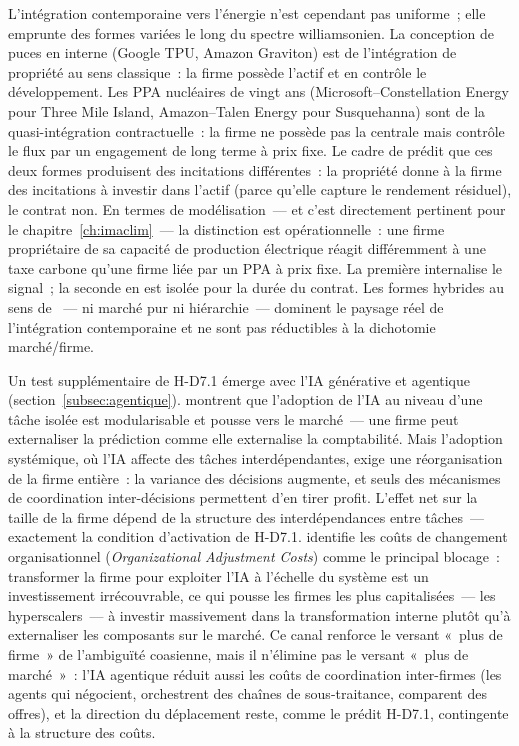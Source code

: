 L'intégration contemporaine vers l'énergie n'est cependant pas uniforme~; elle emprunte des formes variées le long du spectre williamsonien. La conception de puces en interne (Google TPU, Amazon Graviton) est de l'intégration de propriété au sens classique~: la firme possède l'actif et en contrôle le développement. Les PPA nucléaires de vingt ans (Microsoft--Constellation Energy pour Three Mile Island, Amazon--Talen Energy pour Susquehanna) sont de la quasi-intégration contractuelle~: la firme ne possède pas la centrale mais contrôle le flux par un engagement de long terme à prix fixe. Le cadre de \textcite{hart_property_1990} prédit que ces deux formes produisent des incitations différentes~: la propriété donne à la firme des incitations à investir dans l'actif (parce qu'elle capture le rendement résiduel), le contrat non. En termes de modélisation~--- et c'est directement pertinent pour le chapitre~\ref{ch:imaclim}~--- la distinction est opérationnelle~: une firme propriétaire de sa capacité de production électrique réagit différemment à une taxe carbone qu'une firme liée par un PPA à prix fixe. La première internalise le signal~; la seconde en est isolée pour la durée du contrat. Les formes hybrides au sens de \textcite{menard_economics_2004}~--- ni marché pur ni hiérarchie~--- dominent le paysage réel de l'intégration contemporaine et ne sont pas réductibles à la dichotomie marché/firme.

Un test supplémentaire de H-D7.1 émerge avec l'IA générative et agentique (section~\ref{subsec:agentique}). \textcite{agrawal_ai_2024} montrent que l'adoption de l'IA au niveau d'une tâche isolée est modularisable et pousse vers le marché~--- une firme peut externaliser la prédiction comme elle externalise la comptabilité. Mais l'adoption systémique, où l'IA affecte des tâches interdépendantes, exige une réorganisation de la firme entière~: la variance des décisions augmente, et seuls des mécanismes de coordination inter-décisions permettent d'en tirer profit. L'effet net sur la taille de la firme dépend de la structure des interdépendances entre tâches~--- exactement la condition d'activation de H-D7.1. \textcite{bresnahan_innovation_2023} identifie les coûts de changement organisationnel (\emph{Organizational Adjustment Costs}) comme le principal blocage~: transformer la firme pour exploiter l'IA à l'échelle du système est un investissement irrécouvrable, ce qui pousse les firmes les plus capitalisées~--- les hyperscalers~--- à investir massivement dans la transformation interne plutôt qu'à externaliser les composants sur le marché. Ce canal renforce le versant «~plus de firme~» de l'ambiguïté coasienne, mais il n'élimine pas le versant «~plus de marché~»~: l'IA agentique réduit aussi les coûts de coordination inter-firmes (les agents qui négocient, orchestrent des chaînes de sous-traitance, comparent des offres), et la direction du déplacement reste, comme le prédit H-D7.1, contingente à la structure des coûts.

